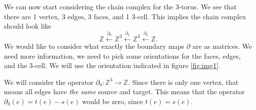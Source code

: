 We can now start considering the chain complex for the
3-torus. We see that there are 1 vertex, 3 edges, 3 faces, and 1
3-cell. This implies the chain complex should look like
\begin{equation}%
\mathbb{Z}\xleftarrow{\partial_{0}}\mathbb{Z}^{3}\xleftarrow{\partial_{1}}\mathbb{Z}^{3}\xleftarrow{\partial_{2}}\mathbb{Z}.
\end{equation}
We would like to consider what exactly the boundary maps
$\partial$ are as matrices. We need more information, we need to
pick some orientations for the faces, edges, and the
3-cell. %
We will use the orientation indicated in figure \ref{fig:img1}. 

We will consider the operator
$\partial_{0}:\mathbb{Z}^{3}\to\mathbb{Z}$. Since there is only
one vertex, that means all edges have \emph{the same} source and
target. This means that the operator $\partial_{0}(e)=t(e)-s(e)$
would be zero, since $t(e)=s(e)$.


